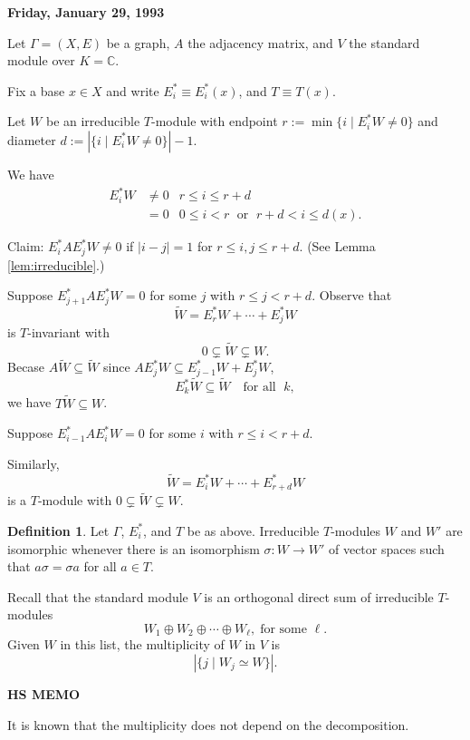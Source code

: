 \documentclass[
]{book}
\theoremstyle{definition}
\newtheorem{definition}{Definition}[chapter]
\theoremstyle{definition}
\theoremstyle{definition}
\theoremstyle{definition}
\theoremstyle{remark}
\begin{document}
\textbf{Friday, January 29, 1993}

Let \(\Gamma = (X, E)\) be a graph, \(A\) the adjacency matrix, and \(V\) the standard module over \(K = \mathbb{C}\).

Fix a base \(x\in X\) and write \(E_i^* \equiv E_i^*(x)\), and \(T \equiv T(x)\).

Let \(W\) be an irreducible \(T\)-module with endpoint \(r:= \min\{i\mid E_i^*W \neq 0\}\) and diameter \(d:=|\{i\mid E_i^*W\neq 0\}|-1\).

We have
\begin{align}
{E^*_i}W & \neq 0 & r\leq i \leq r+d\\
& = 0 & 0 \leq i < r \;\text{ or }\; r+d < i \leq d(x).
\end{align}

Claim: \(E_i^*AE_j^*W \neq 0\) if \(|i-j| = 1\) for \(r\leq i,j\leq r+d\). (See Lemma \ref{lem:irreducible}.)

Suppose \(E_{j+1}^*AE_j^*W = 0\) for some \(j\) with \(r \leq j < r+d\).
Observe that
\[\tilde{W} = E^*_rW + \cdots + E^*_jW\]
is \(T\)-invariant with
\[0 \subsetneq \tilde{W} \subsetneq W.\]
Becase \(A\tilde{W} \subseteq \tilde{W}\) since \(AE_j^*W \subseteq E^*_{j-1}W + E^*_jW\),
\[E_k^*\tilde{W} \subseteq \tilde{W} \quad\text{for all }\; k,\]
we have \(T\tilde{W} \subseteq{W}\).

Suppose \(E_{i-1}^*AE_i^*W = 0\) for some \(i\) with \(r \leq i < r+d\).

Similarly,
\[\tilde{W} = E^*_iW + \cdots + E^*_{r+d}W\]
is a \(T\)-module with \(0\subsetneq \tilde{W} \subsetneq W\).

\begin{definition}
\protect\hypertarget{def:isomorphic-modules}{}\label{def:isomorphic-modules}Let \(\Gamma\), \(E^*_i\), and \(T\) be as above. Irreducible \(T\)-modules \(W\) and \(W'\) are isomorphic whenever there is an isomorphism \(\sigma: W \to W'\) of vector spaces such that \(a\sigma = \sigma a\) for all \(a\in T\).
\end{definition}

Recall that the standard module \(V\) is an orthogonal direct sum of irreducible \(T\)-modules
\[W_1 \oplus W_2 \oplus \cdots \oplus W_{\ell}, \; \text{for some }\ell.\]
Given \(W\) in this list, the multiplicity of \(W\) in \(V\) is
\[|\{j \mid W_j \simeq W\}|.\]

\textbf{HS MEMO}

It is known that the multiplicity does not depend on the decomposition.
\end{document}
